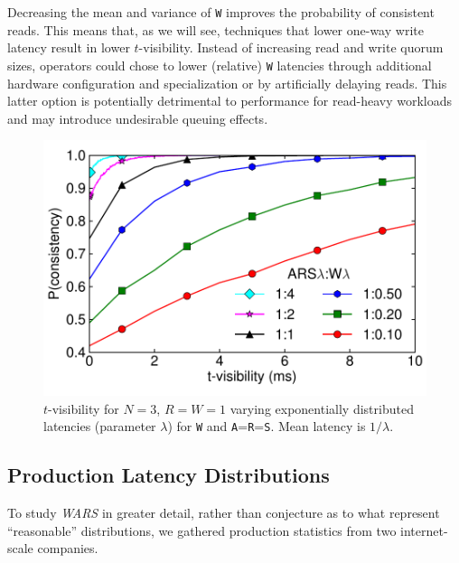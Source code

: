 \documentclass{vldb}
\newcommand{\subsectionskip}{-0em}
\begin{document}
Decreasing the mean and variance of \texttt{W} improves the
probability of consistent reads.  This means that, as we will see,
techniques that lower one-way write latency result in lower
$t$-visibility.  Instead of increasing read and write quorum sizes,
operators could chose to lower (relative) \texttt{W} latencies through
additional hardware configuration and specialization or by
artificially delaying reads.  This latter option is potentially
detrimental to performance for read-heavy workloads and may introduce
undesirable queuing effects.

\begin{figure}
\centering
\includegraphics[width=.85\columnwidth]{figs/rwratio.pdf}
\vspace{-14pt}
\caption{$t$-visibility for $N$$=$$3$, $R$$=$$W$$=$$1$ varying
  exponentially distributed latencies (parameter $\lambda$) for
  \texttt{W} and \texttt{A}=\texttt{R}=\texttt{S}.  Mean latency is
  $1/\lambda$.}
\vspace{-4pt}
\label{fig:varydelay}
\end{figure}

\vspace{\subsectionskip}\subsection{Production Latency Distributions}
\label{sec:latencies}

To study \textit{WARS} in greater detail, rather than conjecture as to
what represent ``reasonable'' distributions, we gathered production
statistics from two internet-scale companies.
\end{document}
